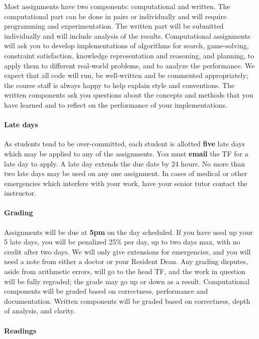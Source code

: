 \documentclass[11pt]{article}
\begin{document}
Most assignments have two components: computational and written. The
computational part can be done in pairs or individually and will
require programming and experimentation. The written part will be
submitted individually and will include analysis of the results.
Computational assignments will ask you to develop implementations of
algorithms for search, game-solving, constraint satisfaction,
knowledge representation and reasoning, and planning, to apply them to
different real-world problems, and to analyze the performance. We
expect that all code will run, be well-written and be commented
appropriately; the course staff is always happy to help explain style
and conventions.  The written components ask you questions about the
concepts and methods that you have learned and to reflect on the
performance of your implementations.

\paragraph{Late days} As students tend to be over-committed, each
student is allotted \textbf{five} late days which may be applied to
any of the assignments.  You must \textbf{email} the TF for a late day
to apply. A late day extends the due date by 24 hours. No more than
two late days may be used on any one assignment. In cases of medical
or other emergencies which interfere with your work, have your senior
tutor contact the instructor. 

\paragraph{Grading} Assignments will be due at \textbf{5pm} on the day
scheduled. If you have used up your 5 late days, you will be penalized
25\% per day, up to two days max, with no credit after two days. We
will only give extensions for emergencies, and you will need a note
from either a doctor or your Resident Dean. Any grading disputes,
aside from arithmetic errors, will go to the head TF, and the work in
question will be fully regraded; the grade may go up or down as a
result. Computational components will be graded based on correctness,
performance and documentation.  Written components will be graded
based on correctness, depth of analysis, and clarity.

\paragraph{Readings}
\end{document}
